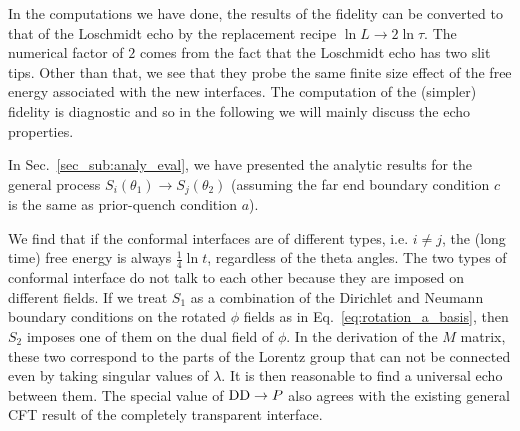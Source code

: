 

In the computations we have done, the results of the fidelity can be converted to that of the Loschmidt echo by the replacement recipe $ \ln L \rightarrow 2 \ln \tau$. The numerical factor of $2$ comes from the fact that the Loschmidt echo has two slit tips. Other than that, we see that they probe the same finite size effect of the free energy associated with the new interfaces. The computation of the (simpler) fidelity is diagnostic and so in the following we will mainly discuss the echo properties. 

In Sec.~\ref{sec_sub:analy_eval}, we have presented the analytic results for the general process $S_i( \theta_1 ) \rightarrow S_j( \theta_2 )$ {\iffalse {\color{red}described in Eq.~\eqref{eq:S_i_S_j}}\fi} (assuming the far end boundary condition $c$ is the same as prior-quench condition $a$). 

We find that if the conformal interfaces are of different types, i.e. $i \ne j$, the (long time) free energy is always $\frac{1}{4} \ln t$, regardless of the theta angles. The two types of conformal interface do not talk to each other because they are imposed on different fields. If we treat $S_1$ as a combination of the Dirichlet and Neumann boundary conditions on the rotated $\phi$ fields as in Eq.~\eqref{eq:rotation_a_basis}, then $S_2$ imposes one of them on the dual field of $\phi$. In the derivation of the $M$ matrix, these two correspond to the parts of the Lorentz group that can not be connected even by taking singular values of $\lambda$. It is then reasonable to find a universal echo between them. The special value of ${\rm DD} \rightarrow P$ also agrees with the existing general CFT result of the completely transparent interface\cite{stephan_logarithmic_2013,stephan_local_2011,vasseur_universal_2014,vasseur_crossover_2013,kennes_universal_2014}. 


